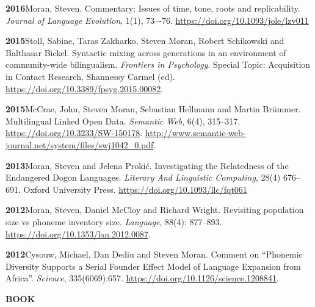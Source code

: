 \documentclass[11pt]{article}
\newcommand{\hangpara}{
 \setlength{\parindent}{0in} %
 \hangindent=0.42in %
}
\begin{document}
\hangpara
\vskip 6pt
{\bf 2016}\hspace{1ex}Moran, Steven. Commentary: Issues of time, tone, roots and replicability. \textit{Journal of Language Evolution}, 1(1), 73–-76. \url{https://doi.org/10.1093/jole/lzv011}

\vskip 6pt
\hangpara
{\bf 2015}\hspace{1ex}Stoll, Sabine, Taras Zakharko, Steven Moran, Robert Schikowski and Balthasar Bickel. Syntactic mixing across generations in an environment of community-wide bilingualism. \textit{Frontiers in Psychology}. Special Topic: Acquisition in Contact Research, Shannessy Carmel (ed). \url{https://doi.org/10.3389/fpsyg.2015.00082}. %

\hangpara
\vskip 6pt
{\bf 2015}\hspace{1ex}McCrae, John, Steven Moran, Sebastian Hellmann and Martin Brümmer. Multilingual Linked Open Data. \textit{Semantic Web}, 6(4), 315--317. \url{https://doi.org/10.3233/SW-150178}. \url{http://www.semantic-web-journal.net/system/files/swj1042\_0.pdf}.

\vskip 6pt
\hangpara
{\bf 2013}\hspace{1ex}Moran, Steven and Jelena Proki{\'c}. Investigating the Relatedness of the Endangered Dogon Languages. \textit{Literary And Linguistic Computing}, 28(4) 676--691. Oxford University Press. \url{https://doi.org/10.1093/llc/fqt061}

\vskip 6pt
\hangpara
{\bf 2012}\hspace{1ex}Moran, Steven, Daniel McCloy and Richard Wright. Revisiting population size vs phoneme inventory size. {\it Language}, 88(4): 877--893. \url{https://doi.org/10.1353/lan.2012.0087}. %

\vskip 6pt
\hangpara
{\bf 2012}\hspace{1ex}Cysouw, Michael, Dan Dediu and Steven Moran. Comment on ``Phonemic Diversity Supports a Serial Founder Effect Model of Language Expansion from Africa''. \textit{Science}, 335(6069):657. \url{https://doi.org/10.1126/science.1208841}.


\vskip 20pt
\begin{flushleft}
{\bf BOOK}
\end{flushleft}
\end{document}
